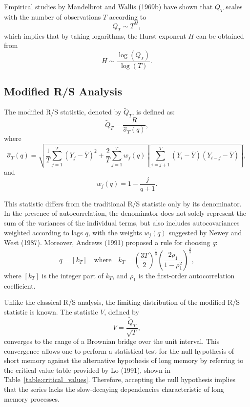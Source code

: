 \documentclass[11pt]{extarticle}
\begin{document}
Empirical studies by Mandelbrot and Wallis (1969b) have shown that \(Q_T\) scales with the number of observations \(T\) according to
\begin{equation}
    Q_T \sim T^H,
\end{equation}
which implies that by taking logarithms, the Hurst exponent \(H\) can be obtained from
\begin{equation}
    H \sim \frac{\log(Q_T)}{\log(T)}.
\end{equation}

\subsection{Modified R/S Analysis}
\label{sec:modified_rs}

The modified R/S statistic, denoted by \(\tilde{Q}_T\), is defined as:
\begin{equation}
    \tilde{Q}_T = \frac{R}{\hat{\sigma}_T(q)},
\end{equation}
where
\begin{equation}
    \hat{\sigma}_T(q) = \sqrt{\frac{1}{T} \sum_{j=1}^{T} (Y_j - \bar{Y})^2 + \frac{2}{T} \sum_{j=1}^{T} w_j(q) \left[ \sum_{i=j+1}^{T} (Y_i - \bar{Y})(Y_{i-j} - \bar{Y}) \right]},
\end{equation}
and
\begin{equation}
    w_j(q) = 1 - \frac{j}{q + 1}.
\end{equation}

This statistic differs from the traditional R/S statistic only by its denominator. In the presence of autocorrelation,
the denominator does not solely represent the sum of the variances of the individual terms, but also includes
autocovariances weighted according to lags \(q\), with the weights \(w_j(q)\) suggested by Newey and West (1987).
Moreover, Andrews (1991) proposed a rule for choosing \(q\):
\begin{equation}
    q = \left[ k_T \right] \quad \text{where} \quad k_T = \left( \frac{3T}{2} \right)^{\frac{1}{3}} \left( \frac{2 \rho_1}{1 - \rho_1^2} \right)^{\frac{2}{3}},
\end{equation}
where \([k_T]\) is the integer part of \(k_T\), and \(\rho_1\) is the first-order autocorrelation coefficient.

Unlike the classical R/S analysis, the limiting distribution of the modified R/S statistic is known. The statistic \(V\), defined by
\begin{equation}
    V = \frac{\tilde{Q}_T}{\sqrt{T}},
\end{equation}
converges to the range of a Brownian bridge over the unit interval.
This convergence allows one to perform a statistical test for the null hypothesis of short memory against the
alternative hypothesis of long memory by referring to the critical value table provided by Lo (1991), shown in Table~\ref{table:critical_values}.
Therefore, accepting the null hypothesis implies that the series lacks the slow-decaying dependencies characteristic of long memory processes.
\end{document}
